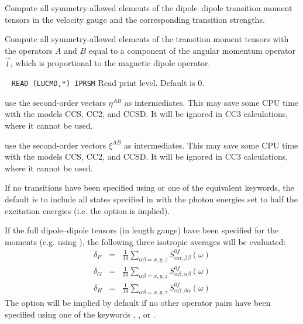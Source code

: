 \begin{description}
Compute all symmetry-allowed elements of the dipole--dipole 
transition moment tensors in the velocity gauge
and the corresponding transition strengths.
%
\item[\Key{ANGMOM}]
Compute all symmetry-allowed elements of 
the transition moment tensors
with the operators $A$ and $B$ equal to 
a component of the angular momentum operator $\vec{l}$,
which is proportional to the magnetic dipole operator.
%
\item[\Key{PRINT}] \verb| |\newline
\verb|READ (LUCMD,*) IPRSM|\newline
Read print level. Default is 0.
%
\item[\Key{USE X2}] use the second-order vectors $\eta^{AB}$ as intermediates.
   This may save some CPU time with the models CCS, CC2, and CCSD.
   It will be ignored in CC3 calculations, where it cannot be used. 
%
\item[\Key{USE O2}] use the second-order vectors $\xi^{AB}$ as intermediates.
   This may save some CPU time with the models CCS, CC2, and CCSD.
   It will be ignored in CC3 calculations, where it cannot be used. 
\end{description}
If no transitions have been specified using  or one
of the equivalent keywords, the default is to include all 
states specified in  with the photon energies
set to half the excitation energies 
(i.e. the  option is implied).

If the full dipole--dipole tensors (in length gauge) have been specified for the
moments (e.g. using ), the following three isotropic averages will be
evaluated:
\begin{eqnarray*}
  \delta_F & = & \frac{1}{30} 
   \sum_{\alpha\beta=x,y,z} S^{0f}_{\alpha\alpha,\beta\beta}(\omega)
\\
  \delta_G & = & \frac{1}{30} 
   \sum_{\alpha\beta=x,y,z} S^{0f}_{\alpha\beta,\alpha\beta}(\omega)
\\
  \delta_H & = & \frac{1}{30} 
   \sum_{\alpha\beta=x,y,z} S^{0f}_{\alpha\beta,\beta\alpha}(\omega)
\end{eqnarray*}
The option  will be implied by default if no other
operator pairs have been specified using one of the keywords
, , or .


